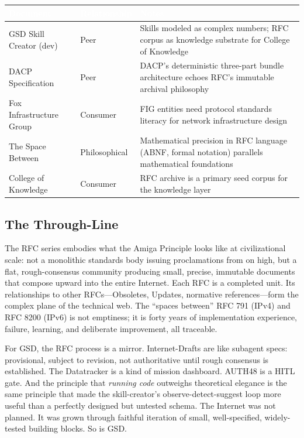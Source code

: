 \documentclass[11pt,letterpaper]{article}
\newcommand{\tableheader}[1]{\textbf{\sffamily\textcolor{white}{#1}}}
\begin{document}
\begin{center}
\begin{tabularx}{\textwidth}{L{4cm}L{3cm}X}
\toprule
{}
\tableheader{Document} & \tableheader{Relationship} & \tableheader{Notes} \\
\midrule
GSD Skill Creator (dev) & Peer & Skills modeled as complex numbers; RFC corpus as knowledge substrate for College of Knowledge \\
DACP Specification & Peer & DACP's deterministic three-part bundle architecture echoes RFC's immutable archival philosophy \\
Fox Infrastructure Group & Consumer & FIG entities need protocol standards literacy for network infrastructure design \\
The Space Between & Philosophical & Mathematical precision in RFC language (ABNF, formal notation) parallels mathematical foundations \\
College of Knowledge & Consumer & RFC archive is a primary seed corpus for the knowledge layer \\
\bottomrule
\end{tabularx}
\end{center}

\subsection{The Through-Line}

The RFC series embodies what the Amiga Principle looks like at civilizational scale: not a monolithic standards body issuing proclamations from on high, but a flat, rough-consensus community producing small, precise, immutable documents that compose upward into the entire Internet. Each RFC is a completed unit. Its relationships to other RFCs---Obsoletes, Updates, normative references---form the complex plane of the technical web. The ``spaces between'' RFC 791 (IPv4) and RFC 8200 (IPv6) is not emptiness; it is forty years of implementation experience, failure, learning, and deliberate improvement, all traceable.

For GSD, the RFC process is a mirror. Internet-Drafts are like subagent specs: provisional, subject to revision, not authoritative until rough consensus is established. The Datatracker is a kind of mission dashboard. AUTH48 is a HITL gate. And the principle that \textit{running code} outweighs theoretical elegance is the same principle that made the skill-creator's observe-detect-suggest loop more useful than a perfectly designed but untested schema. The Internet was not planned. It was grown through faithful iteration of small, well-specified, widely-tested building blocks. So is GSD.
\end{document}
